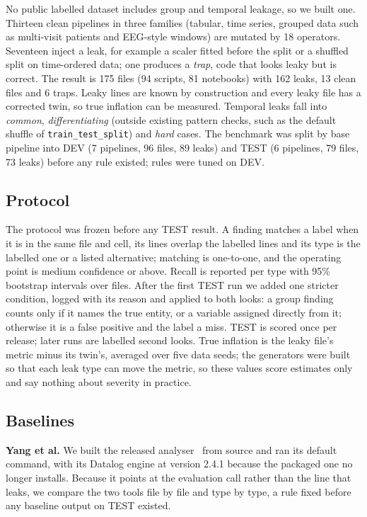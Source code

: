 \documentclass[conference]{IEEEtran}
\newcommand{\code}[1]{\texttt{#1}}
\begin{document}
No public labelled dataset includes group and temporal leakage, so we built one. Thirteen clean pipelines in three
families (tabular, time series, grouped data such as multi-visit patients and EEG-style windows) are mutated by 18
operators. Seventeen inject a leak, for example a scaler fitted before the split or a shuffled split on
time-ordered data; one produces a \emph{trap}, code that looks leaky but is correct. The result is 175 files (94
scripts, 81 notebooks) with 162 leaks, 13 clean files and 6 traps. Leaky lines are known by construction and
every leaky file has a corrected twin, so true inflation can be measured. Temporal leaks fall into \emph{common},
\emph{differentiating} (outside existing pattern checks, such as the default shuffle of
\code{train\_test\_split}) and \emph{hard} cases. The benchmark was split by base pipeline into DEV (7 pipelines,
96 files, 89 leaks) and TEST (6 pipelines, 79 files, 73 leaks) before any rule existed; rules were tuned on DEV.

\subsection{Protocol}

The protocol was frozen before any TEST result. A finding matches a label when it is in the same file and
cell, its lines overlap the labelled lines and its type is the labelled one or a listed alternative; matching is
one-to-one, and the operating point is medium confidence or above. Recall is reported per type with 95\% bootstrap
intervals over files. After the first TEST run we added one stricter condition, logged with its reason and applied to
both looks: a group finding counts only if it names the true entity, or a variable assigned directly from it;
otherwise it is a false positive and the label a miss. TEST is scored once per release; later runs are labelled
second looks. True inflation is the leaky file's metric minus its twin's, averaged over five data seeds; the
generators were built so that each leak type can move the metric, so these values score estimates only and say
nothing about severity in practice.

\subsection{Baselines}

\textbf{Yang et al.} We built the released analyser~\cite{yang2022} from source and ran its default command, with
its Datalog engine at version 2.4.1 because the packaged one no longer installs. Because it points at the
evaluation call rather than the line that leaks, we compare the two tools file by file and type by type, a rule
fixed before any baseline output on TEST existed.
\end{document}
